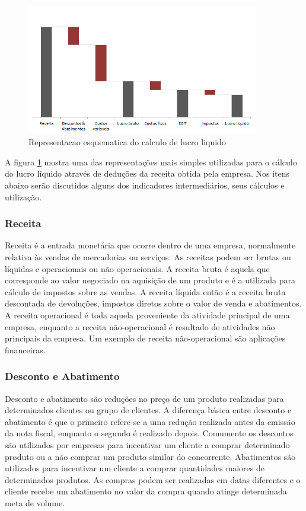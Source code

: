 \documentclass[12pt]{article}
\begin{document}
\begin{figure}[h!]
	\centering
	\includegraphics[width=0.9\textwidth]{img/finance.png}
	\caption{Representacao esquematica do calculo de lucro liquido}
	\label{fig:lucro}
\end{figure}

	A figura \ref{fig:lucro} mostra uma das representações mais simples utilizadas para o cálculo do lucro líquido através de deduções da receita obtida pela empresa. Nos itens abaixo serão discutidos alguns dos indicadores intermediários, seus cálculos e utilização. 

\subsubsection{Receita}

	Receita é a entrada monetária que ocorre dentro de uma empresa, normalmente relativa às vendas de mercadorias ou serviços. As receitas podem ser brutas ou líquidas e operacionais ou não-operacionais. A receita bruta é aquela que corresponde ao valor negociado na aquisição de um produto e é a utilizada para cálculo de impostos sobre as vendas. A receita líquida então é a receita bruta descontada de devoluções, impostos diretos sobre o valor de venda e abatimentos.
A receita operacional é toda aquela proveniente da atividade principal de uma empresa, enquanto a receita não-operacional é resultado de atividades não principais da empresa. Um exemplo de receita não-operacional são aplicações financeiras.

\subsubsection{Desconto e Abatimento}

	Desconto e abatimento são reduções no preço de um produto realizadas para determinados clientes ou grupo de clientes. A diferença básica entre desconto e abatimento é que o primeiro refere-se a uma redução realizada antes da emissão da nota fiscal, enquanto o segundo é realizado depois. Comumente os descontos são utilizados por empresas para incentivar um cliente a comprar determinado produto ou a não comprar um produto similar do concorrente. Abatimentos são utilizados para incentivar um cliente a comprar quantidades maiores de determinados produtos. As compras podem ser realizadas em datas diferentes e o cliente recebe um abatimento no valor da compra quando atinge determinada meta de volume.
\end{document}
